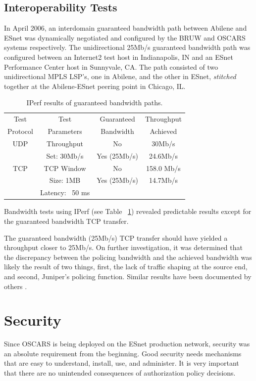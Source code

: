 \documentclass[conference]{IEEEtran}
\begin{document}
 \subsection{Interoperability Tests}

In April 2006, an interdomain guaranteed bandwidth path between Abilene and 
ESnet was dynamically negotiated and configured by the BRUW and OSCARS systems 
respectively. The unidirectional 25Mb/s guaranteed bandwidth path was 
configured between an Internet2 test host in Indianapolis, IN and an ESnet 
Performance Center \cite{esnet-pc} host in Sunnyvale, CA.  The path consisted of two 
unidirectional MPLS LSP's, one in Abilene, and the 
other in ESnet, \emph{stitched} together at the Abilene-ESnet peering point in 
Chicago, IL.

\begin{table}
 \centering
 {\scriptsize
 \begin{tabular}{|c|c|c|c|}
 \hline
 Test     & Test       & Guaranteed & Throughput  \\ 
 Protocol & Parameters & Bandwidth  & Achieved    \\ \hline \hline 
 UDP      & Throughput  & No         &   30Mb/s   \\ \cline{3-4}
          & Set: 30Mb/s& Yes (25Mb/s)&   24.6Mb/s \\ \hline
 TCP      & TCP Window & No         & 158.0 Mb/s  \\ \cline{3-4}
          & Size: 1MB  & Yes (25Mb/s)&  14.7Mb/s  \\ 
          & Latency: ~50 ms &          &            \\  \hline
 \end{tabular}
 }
 \caption{IPerf results of guaranteed bandwidth paths.}
 \label{tab:bandwidth}
\end{table}


Bandwidth tests using IPerf \cite{iperf} (see Table ~\ref{tab:bandwidth}) revealed
predictable results except for the guaranteed bandwidth TCP transfer.

The guaranteed bandwidth (25Mb/s) TCP transfer should have yielded a 
throughput closer to 25Mb/s.  On further investigation, it was determined 
that the 
discrepancy between the policing bandwidth and the achieved bandwidth was 
likely the result of two things, first, the lack of traffic shaping at the 
source end, and second, Juniper's policing function.  Similar results have 
been documented by others \cite{martelli}.


\section{Security}
Since OSCARS is being deployed on the ESnet production network, security was 
an absolute requirement from the beginning. Good security needs mechanisms that are easy to understand, install, use, and administer. It is very important that there
are no unintended consequences of authorization policy decisions.
\end{document}
